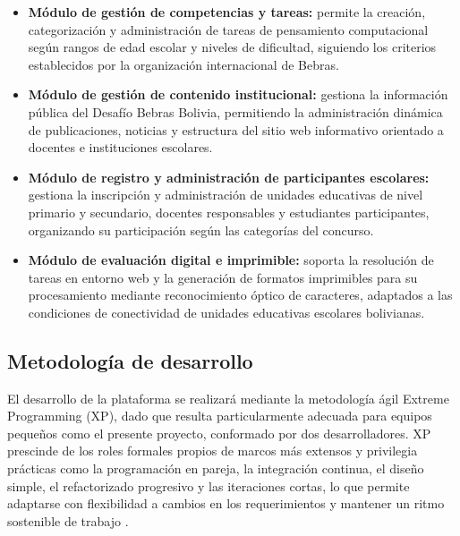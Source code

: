     \begin{itemize}
        \item \textbf{Módulo de gestión de competencias y tareas:} permite la creación,
        categorización y administración de tareas de pensamiento computacional según
        rangos de edad escolar y niveles de dificultad, siguiendo los criterios
        establecidos por la organización internacional de Bebras.

        \item \textbf{Módulo de gestión de contenido institucional:} gestiona la información
        pública del Desafío Bebras Bolivia, permitiendo la administración dinámica de
        publicaciones, noticias y estructura del sitio web informativo orientado a
        docentes e instituciones escolares.

        \item \textbf{Módulo de registro y administración de participantes escolares:} gestiona
        la inscripción y administración de unidades educativas de nivel primario y
        secundario, docentes responsables y estudiantes participantes, organizando su
        participación según las categorías del concurso.

        \item \textbf{Módulo de evaluación digital e imprimible:} soporta la resolución de
        tareas en entorno web y la generación de formatos imprimibles para su
        procesamiento mediante reconocimiento óptico de caracteres, adaptados a las
        condiciones de conectividad de unidades educativas escolares bolivianas.
    \end{itemize}

\subsection{Metodología de desarrollo}

    El desarrollo de la plataforma se realizará mediante la metodología ágil
    Extreme Programming (XP), dado que resulta particularmente adecuada para
    equipos pequeños como el presente proyecto, conformado por dos desarrolladores.
    XP prescinde de los roles formales propios de marcos más extensos y privilegia
    prácticas como la programación en pareja, la integración continua, el diseño
    simple, el refactorizado progresivo y las iteraciones cortas, lo que permite
    adaptarse con flexibilidad a cambios en los requerimientos y mantener un ritmo
    sostenible de trabajo \cite{beckandres2004}.

